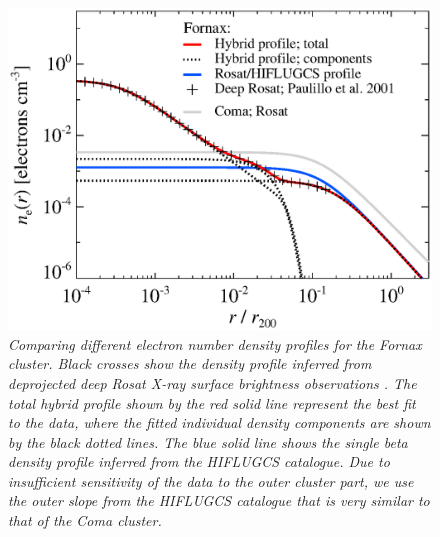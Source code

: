\documentclass[10pt,aps,pra,reprint,amsmath,amsfonts,amssymb,showpacs,nofootinbib,floatfix]{revtex4-1}
\def\del#1{{}}
\begin{document}
\begin{figure}%
 \includegraphics[width=0.99\columnwidth]{figures/dens.fornax.eps}
 \caption{\it Comparing different electron number density profiles for
   the Fornax cluster. Black crosses show the density profile inferred
   from deprojected deep Rosat X-ray surface brightness observations
   \protect \cite{2002ApJ...565..883P}. The total hybrid profile shown
   by the red solid line represent the best fit to the data, where the
   fitted individual density components are shown by the black dotted
   lines. The blue solid line shows the single beta density profile
   inferred from the HIFLUGCS catalogue. Due to insufficient
   sensitivity of the data to the outer cluster part, we use the outer
   slope from the HIFLUGCS catalogue that is very similar to that of
   the Coma cluster.}
 \label{fig:dens_fornax}
\end{figure}

\del{
\section{Flux tables for the HIFLUGCS catalouge}
TO BE WRITTEN
}
\end{document}
